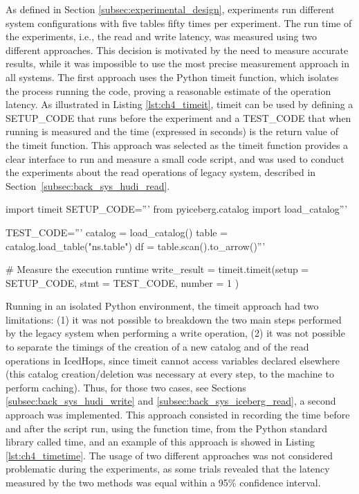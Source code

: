 As defined in Section \ref{subsec:experimental_design}, experiments run different system configurations with five tables fifty times per experiment.
The run time of the experiments, i.e., the read and write latency, was measured using two different approaches. This decision is motivated by the need to measure accurate results, while it was impossible to use the most precise measurement approach in all systems. The first approach uses the Python timeit function, which isolates the process running the code, proving a reasonable estimate of the operation latency. As illustrated in Listing \ref{lst:ch4_timeit}, timeit can be used by defining a SETUP\_CODE that runs before the experiment and a TEST\_CODE that when running is measured and the time (expressed in seconds) is the return value of the timeit function. This approach was selected as the timeit function provides a clear interface to run and measure a small code script, and was used to conduct the experiments about the read operations of legacy system, described in Section~\ref{subsec:back_sys_hudi_read}.

\begin{minipage}{\textwidth}
    \begin{python}[caption={[Measuring latency using Timeit] Timeit usage to measure the time to read from an Iceberg table stored on \gls{HopsFS}.}, label={lst:ch4_timeit}, basicstyle=\small]
    import timeit
    SETUP_CODE='''
    from pyiceberg.catalog import load_catalog'''
        
    TEST_CODE='''
    catalog = load_catalog()
    table   = catalog.load_table("ns.table")
    df      = table.scan().to_arrow()'''
    
    # Measure the execution runtime
    write_result = timeit.timeit(setup  = SETUP_CODE,
                                 stmt   = TEST_CODE,
                                 number = 1          )
    \end{python}
\end{minipage}
\medskip

Running in an isolated Python environment, the timeit approach had two limitations: (1) it was not possible to breakdown the two main steps performed by the legacy system when performing a write operation, (2) it was not possible to separate the timings of the creation of a new catalog and of the read operations in IcedHops, since timeit cannot access variables declared elsewhere (this catalog creation/deletion was necessary at every step, to the machine to perform caching). Thus, for those two cases, see Sections \ref{subsec:back_sys_hudi_write} and \ref{subsec:back_sys_iceberg_read}, a second approach was implemented. This approach consisted in recording the time before and after the script run, using the function time, from the Python standard library called time, and an example of this approach is showed in Listing \ref{lst:ch4_timetime}. The usage of two different approaches was not considered problematic during the experiments, as some trials revealed that the latency measured by the two methods was equal within a 95\% confidence interval.

